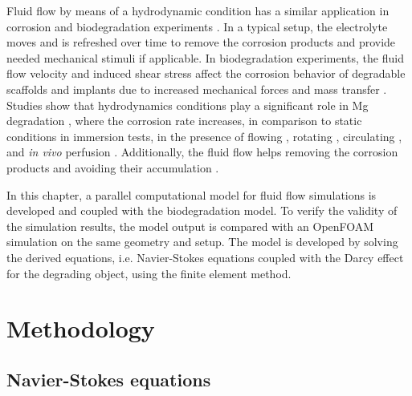 Fluid flow by means of a hydrodynamic condition has a similar application in corrosion and biodegradation experiments \cite{Wang2014}. In a typical setup, the electrolyte moves and is refreshed over time to remove the corrosion products and provide needed mechanical stimuli if applicable. In biodegradation experiments, the fluid flow velocity and induced shear stress affect the corrosion behavior of degradable scaffolds and implants due to increased mechanical forces and mass transfer \cite{Wang2014}. Studies show that hydrodynamics conditions play a significant role in Mg degradation \cite{Levesque2008}, where the corrosion rate increases, in comparison to static conditions in immersion tests, in the presence of flowing \cite{Li2012}, rotating \cite{Jafarzadeh2009}, circulating \cite{Chen2010}, and \textit{in vivo} perfusion \cite{Witte2013}. Additionally, the fluid flow helps removing the corrosion products and avoiding their accumulation \cite{Hiromoto2008}.

In this chapter, a parallel computational model for fluid flow simulations is developed and coupled with the biodegradation model. To verify the validity of the simulation results, the model output is compared with an OpenFOAM simulation on the same geometry and setup. The model is developed by solving the derived equations, i.e. Navier-Stokes equations coupled with the Darcy effect for the degrading object, using the finite element method.

\section{Methodology}

\subsection{Navier-Stokes equations}

